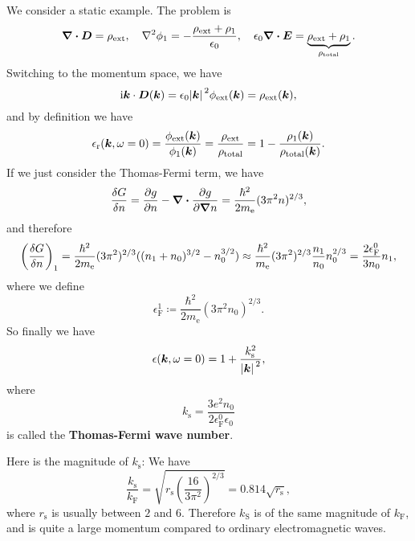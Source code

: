 \documentclass[hyperref, a4paper]{article}
\newcommand*{\ii}{\mathrm{i}}
\newcommand*{\concept}[1]{{\textbf{#1}}}
\begin{document}
We consider a static example. The problem is 
\begin{equation}
    \div{\vb*{D}} = \rho_\text{ext}, \quad \laplacian \phi_1 = - \frac{\rho_\text{ext} + \rho_1}{\epsilon_0}, \quad \epsilon_0 \div{\vb*{E}} = \underbrace{\rho_\text{ext} + \rho_1}_{\rho_\text{total}}. 
\end{equation}
Switching to the momentum space, we have 
\[
    \ii \vb*{k} \cdot \vb*{\vb*{D}}(\vb*{k}) = \epsilon_0 \abs*{\vb*{k}}^2 \phi_\text{ext}(\vb*{k}) = \rho_\text{ext}(\vb*{k}), 
\]
and by definition we have 
\begin{equation}
    \epsilon_\text{r}(\vb*{k}, \omega = 0) = \frac{\phi_\text{ext}(\vb*{k})}{\phi_1(\vb*{k})} = \frac{\rho_\text{ext}}{\rho_\text{total}} = 1 - \frac{\rho_1(\vb*{k})}{\rho_\text{total}(\vb*{k})}.
\end{equation}
If we just consider the Thomas-Fermi term, we have 
\[
    \fdv{G}{n} = \pdv{g}{n} - \div{\pdv{g}{\grad{n}} } = \frac{\hbar^2}{2m_\text{e}} (3\pi^2 n)^{2/3} ,
\]
and therefore 
\[
    \left(\fdv{G}{n}\right)_1 = \frac{\hbar^2}{2m_\text{e}} (3\pi^2 )^{2/3} ((n_1 + n_0)^{3/2} - n_0^{3/2}) \approx \frac{\hbar^2}{m_\text{e}} (3\pi^2)^{2/3} \frac{n_1}{n_0} n_0^{2/3} = \frac{2 \epsilon_\text{F}^0}{3 n_0} n_1,
\]
where we define
\begin{equation}
    \epsilon_\text{F}^1 \coloneqq \frac{\hbar^2}{2m_\text{e}} (3\pi^2 n_0)^{2/3}.
\end{equation}
So finally we have 
\begin{equation}
    \epsilon(\vb*{k}, \omega=0) = 1 + \frac{k_\text{s}^2}{\abs*{\vb*{k}}^2},
\end{equation}
where 
\begin{equation}
    k_\text{s} = \frac{3 e^2 n_0}{ 2 \epsilon_\text{F}^0 \epsilon_0} 
    \label{eq:thomas-fermi-approx}
\end{equation}
is called the \concept{Thomas-Fermi wave number}.

Here is the magnitude of $k_\text{s}$: We have 
\begin{equation}
    \frac{k_\text{s}}{k_\text{F}} = \sqrt{r_\text{s} \left(\frac{16}{3\pi^2}\right)^{2/3}} = 0.814 \sqrt{r_\text{s}},
\end{equation}
where $r_\text{s}$ is usually between $2$ and $6$.
Therefore $k_\text{S}$ is of the same magnitude of $k_\text{F}$, and is quite a large momentum compared to ordinary electromagnetic waves.
\end{document}
